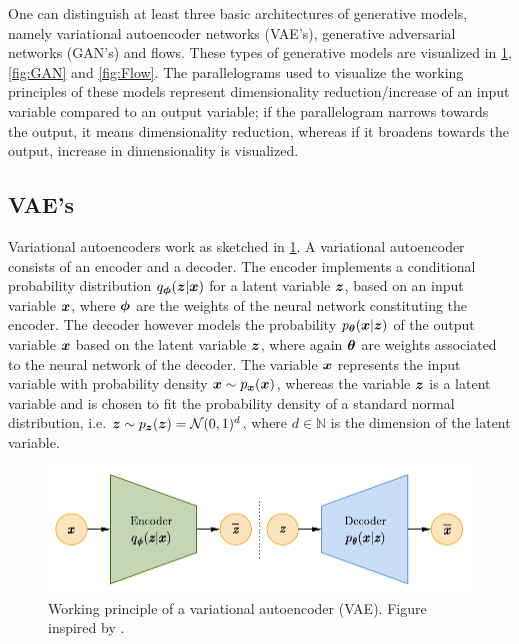 \documentclass[a4paper,11pt]{report}
\begin{document}
One can distinguish at least three basic architectures of generative models, namely variational autoencoder networks (VAE's), generative adversarial networks (GAN's) and flows. These types of generative models are visualized in \cref{fig:VAE}, \cref{fig:GAN} and \cref{fig:Flow}. The parallelograms used to visualize the working principles of these models represent dimensionality reduction/increase of an input variable compared to an output variable; if the parallelogram narrows towards the output, it means dimensionality reduction, whereas if it broadens towards the output, increase in dimensionality is visualized.
\subsection{VAE's}
Variational autoencoders work as sketched in \cref{fig:VAE}. A variational autoencoder consists of an encoder and a decoder. The encoder implements a conditional probability distribution $q_{\bm{\phi}}(\bm{z}|\bm{x})$ for a latent variable $\bm{z}$, based on an input variable $\bm{x}$, where $\bm{\phi}$ are the weights of the neural network constituting the encoder. The decoder however models the probability $p_{\bm{\theta}}(\bm{x}|\bm{z})$ of the output variable $\bm{x}$ based on the latent variable $\bm{z}$, where again $\bm{\theta}$ are weights associated to the neural network of the decoder. The variable $\bm{x}$ represents the input variable with probability density $\bm{x} \sim p_{\bm{x}}(\bm{x})$, whereas the variable $\bm{z}$ is a latent variable and is chosen to fit the probability density of a standard normal distribution, i.e. $\bm{z}\sim p_{\bm{z}}(\bm{z}) = \mathcal{N}(0,1)^d$, where $d \in \mathbb{N}$ is the dimension of the latent variable.
\begin{figure}[h!]
\centering
\includegraphics[width=\linewidth-4cm]{figures/VAE.pdf}
\caption{Working principle of a variational autoencoder (VAE). Figure inspired by \cite{weng2018flow}.}
\label{fig:VAE}
\end{figure}
\end{document}
